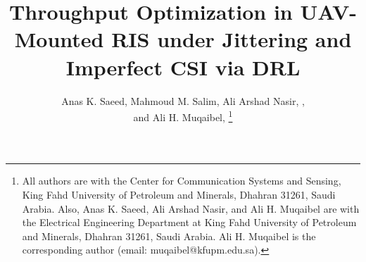 \title{Throughput Optimization in UAV-Mounted RIS under Jittering and Imperfect CSI via DRL}
\author{\IEEEauthorblockN{}
}
\author{Anas K. Saeed, Mahmoud M. Salim, Ali Arshad Nasir, , \\
and Ali H. Muqaibel,
\thanks{All authors are with the Center for Communication Systems and Sensing, King Fahd University of Petroleum and Minerals, Dhahran 31261, Saudi Arabia. Also, Anas K. Saeed, Ali Arshad Nasir, and Ali H. Muqaibel are with the Electrical Engineering Department at King Fahd University of Petroleum and Minerals, Dhahran 31261, Saudi Arabia. Ali H. Muqaibel is the corresponding author (email: muqaibel@kfupm.edu.sa).}}